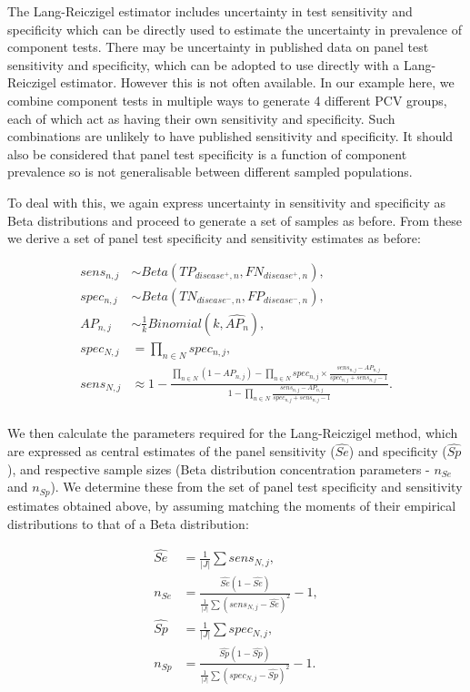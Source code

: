 \documentclass[a4paper, 12pt, twoside]{article}
\begin{document}
The Lang-Reiczigel estimator\cite{lang2014} includes uncertainty in test sensitivity and specificity which can be directly used to estimate the uncertainty in prevalence of component tests. There may be uncertainty in published data on panel test sensitivity and specificity, which can be adopted to use directly with a Lang-Reiczigel estimator. However this is not often available. In our example here, we combine component tests in multiple ways to generate 4 different PCV groups, each of which act as having their own sensitivity and specificity. Such combinations are unlikely to have published sensitivity and specificity. It should also be considered that panel test specificity is a function of component prevalence so is not generalisable between different sampled populations.

To deal with this, we again express uncertainty in sensitivity and specificity as Beta distributions and proceed to generate a set of samples as before. From these we derive a set of panel test specificity and sensitivity estimates as before:

\begin{equation*}
\begin{aligned}
sens_{n,j} &\sim Beta(TP_{disease^+,n}, FN_{disease^+,n}), \\
spec_{n,j} &\sim Beta(TN_{disease^-,n}, FP_{disease^-,n}), \\
AP_{n,j} &\sim \frac{1}{k}Binomial(k, \widehat{AP_n}), \\
spec_{N,j} &= \prod_{n \in N}{spec_{n,j}}, \\
sens_{N,j} &\approx 1-\frac{
  \prod_{n \in N}{(1-AP_{n,j})} - \prod_{n \in N}{spec_{n,j} \times \frac{sens_{n,j}-AP_{n,j}}{spec_{n,j} + sens_{n,j} - 1}}
}{
  1 - \prod_{n \in N}{ \frac{sens_{n,j}-AP_{n,j}}{spec_{n,j} + sens_{n,j} - 1} }
}. \\
\end{aligned}
\end{equation*}

We then calculate the parameters required for the Lang-Reiczigel method\cite{lang2014}, which are expressed as central estimates of the panel sensitivity (\(\widehat{Se}\)) and specificity (\(\widehat{Sp}\)), and respective sample sizes (Beta distribution concentration parameters - \(n_{Se}\) and \(n_{Sp}\)). We determine these from the set of panel test specificity and sensitivity estimates obtained above, by assuming matching the moments of their empirical distributions to that of a Beta distribution:

\begin{equation*}
\begin{aligned}
\widehat{Se} &= \frac{1}{|J|}\sum{sens_{N,j}},\\
n_{Se} &= \frac{
\widehat{Se}(1-\widehat{Se})
}{
\frac{1}{|J|}\sum{(sens_{N,j}-\widehat{Se})^2}
}-1,\\
\widehat{Sp} &= \frac{1}{|J|}\sum{spec_{N,j}},\\
n_{Sp} &= \frac{
\widehat{Sp}(1-\widehat{Sp})
}{
\frac{1}{|J|}\sum{(spec_{N,j}-\widehat{Sp})^2}
}-1.\\
\end{aligned}
\end{equation*}
\end{document}
